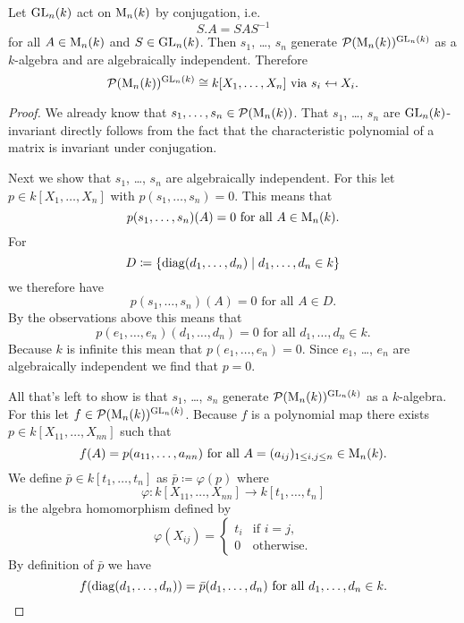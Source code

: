 \begin{thrm}
  Let $\operatorname{GL}_n(k)$ act on $\operatorname{M}_n(k)$ by conjugation, i.e.\
  \[
    S.A = SAS^{-1}
  \]
  for all $A \in \operatorname{M}_n(k)$ and $S \in \operatorname{GL}_n(k)$. Then $s_1$, \dots, $s_n$ generate $\mathcal{P}(\operatorname{M}_n(k))^{\operatorname{GL}_n(k)}$ as a $k$-algebra and are algebraically independent. Therefore
  \[
    \mathcal{P}(\operatorname{M}_n(k))^{\operatorname{GL}_n(k)} \cong k[X_1, \dotsc, X_n] \text{ via } s_i \mapsfrom X_i.
  \]
\end{thrm}
\begin{proof}
  We already know that $s_1, \dotsc, s_n \in \mathcal{P}(\operatorname{M}_n(k))$. That $s_1$, \dots, $s_n$ are $\operatorname{GL}_n(k)$-invariant directly follows from the fact that the characteristic polynomial of a matrix is invariant under conjugation.
  
  Next we show that $s_1$, \dots, $s_n$ are algebraically independent. For this let $p \in k[X_1, \dotsc, X_n]$ with $p(s_1, \dotsc, s_n) = 0$. This means that
  \[
    p(s_1, \dotsc, s_n)(A) = 0 \text{ for all } A \in \operatorname{M}_n(k).
  \]
  For
  \[
    D \coloneqq \{\operatorname{diag}(d_1, \dotsc, d_n) \mid d_1, \dotsc, d_n \in k\}
  \]
  we therefore have
  \[
    p(s_1, \dotsc, s_n)(A) = 0 \text{ for all } A \in D.
  \]
  By the observations above this means that 
  \[
    p(e_1, \dotsc, e_n)(d_1, \dotsc, d_n) = 0 \text{ for all } d_1, \dotsc, d_n \in k.
  \]
  Because $k$ is infinite this mean that $p(e_1, \dotsc, e_n) = 0$. Since $e_1$, \dots, $e_n$ are algebraically independent we find that $p =0$.
  
  All that’s left to show is that $s_1$, \dots, $s_n$ generate $\mathcal{P}(\operatorname{M}_n(k))^{\operatorname{GL}_n(k)}$ as a $k$-algebra. For this let $f \in \mathcal{P}(\operatorname{M}_n(k))^{\operatorname{GL}_n(k)}$. Because $f$ is a polynomial map there exists $p \in k[X_{11}, \dotsc, X_{nn}]$ such that
  \[
    f(A) = p(a_{11}, \dotsc, a_{nn}) \text{ for all } A = (a_{ij})_{1 \leq i,j \leq n} \in \operatorname{M}_n(k).
  \]
  We define $\bar{p} \in k[t_1, \dotsc, t_n]$ as $\bar{p} \coloneqq \varphi(p)$ where
  \[
    \varphi \colon k[X_{11}, \dotsc, X_{nn}] \to k[t_1, \dotsc, t_n]
  \]
  is the algebra homomorphism defined by
  \[
    \varphi(X_{ij}) =
    \begin{cases}
      t_i & \text{if } i = j, \\
          0 & \text{otherwise}.
    \end{cases}
  \]
  By definition of $\bar{p}$ we have
  \[
    f(\operatorname{diag}(d_1, \dotsc, d_n)) = \bar{p}(d_1, \dotsc, d_n) \text{ for all } d_1, \dotsc, d_n \in k.
  \]
  

\end{proof}
